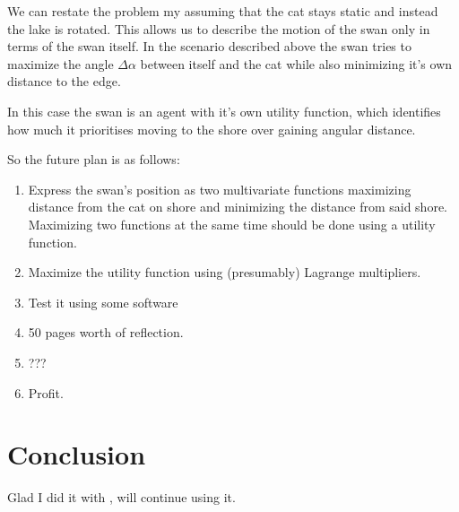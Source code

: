\documentclass[12pt]{article}
\begin{document}
We can restate the problem my assuming that the cat stays static and instead the lake is rotated. This allows us to describe the motion of the swan only in terms of the swan itself. In the scenario described above the swan tries to maximize the angle $\Delta \alpha$ between itself and the cat while also minimizing it's own distance to the edge.

In this case the swan is an agent with it's own utility function, which identifies how much it prioritises moving to the shore over gaining angular distance.

\begin{center}
	\color{blue}
	So the future plan is as follows:
	\begin{enumerate}
		\item Express the swan's position as two multivariate functions maximizing distance from the cat on shore and minimizing the distance from said shore. Maximizing two functions at the same time should be done using a utility function.
		\item Maximize the utility function using (presumably) Lagrange multipliers.
		\item Test it using some software
		\item 50 pages worth of reflection.
		\item ???
		\item Profit.
	\end{enumerate}
\end{center}


\section{Conclusion}
Glad I did it with \LaTeXe\cite{latex2e}, will continue using it.



\end{document}
